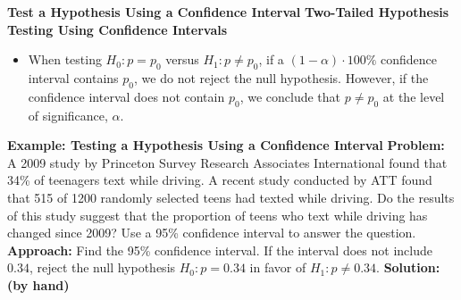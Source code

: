 \documentclass{report}
\begin{document}
    \pagebreak \bigbreak \noindent 
    \textbf{Test a Hypothesis Using a Confidence Interval}
    \bigbreak \noindent 
    \textbf{Two-Tailed Hypothesis Testing Using Confidence Intervals}
    \bigbreak \noindent 
    \begin{itemize}
        \item  When testing \(H_0: p = p_0\) versus \(H_1: p \neq p_0\), if a \((1 - \alpha) \cdot 100\%\) confidence interval contains \(p_0\), we do not reject the null hypothesis. However, if the confidence interval does not contain \(p_0\), we conclude that \(p \neq p_0\) at the level of significance, \(\alpha\).
    \end{itemize}
    \bigbreak \noindent 
    \begin{mdframed}
      \textbf{Example: Testing a Hypothesis Using a Confidence Interval}
      \bigbreak \noindent 
      \textbf{Problem:}
      A 2009 study by Princeton Survey Research Associates International found that 34\% of teenagers text while driving. A recent study conducted by ATT found that 515 of 1200 randomly selected teens had texted while driving. Do the results of this study suggest that the proportion of teens who text while driving has changed since 2009? Use a 95\% confidence interval to answer the question.
      \bigbreak \noindent 
      \textbf{Approach:}
      Find the 95\% confidence interval. If the interval does not include $0.34$, reject the null hypothesis $H_0: p=0.34$ in favor of $H_1: p\neq0.34$.
      \bigbreak \noindent 
      \textbf{Solution: (by hand)}
      \bigbreak \noindent 
    \end{mdframed}

    \pagebreak 
\end{document}
